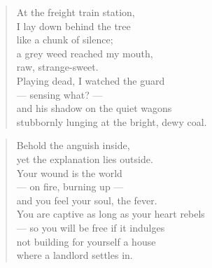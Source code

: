 

\begin{verse}
  At the freight train station, \\
  I lay down behind the tree \\
  like a chunk of silence; \\
  a grey weed reached my mouth, \\
  raw, strange-sweet. \\
  Playing dead, I watched the guard \\
  --- sensing what? --- \\
  and his shadow on the quiet wagons \\
  stubbornly lunging at the bright, dewy coal.
\end{verse}

\bigskip




\begin{verse}
  Behold the anguish inside, \\
  yet the explanation lies outside. \\
  Your wound is the world \\
  --- on fire, burning up --- \\
  and you feel your soul, the fever. \\
  You are captive as long as your heart rebels \\
  --- so you will be free if it indulges \\
  not building for yourself a house \\
  where a landlord settles in.
\end{verse}

\bigskip

\newpage

